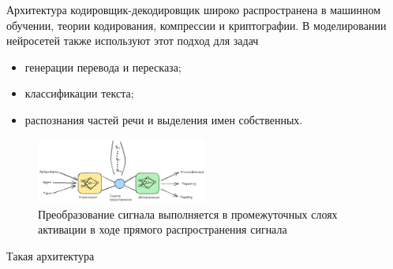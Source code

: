 Архитектура кодировщик-декодировщик широко распространена в машинном обучении, теории кодирования, компрессии и
криптографии. В моделировании нейросетей также используют этот подход для задач \begin{itemize}
    \item генерации перевода и пересказа;
    \item классификации текста;
    \item распознания частей речи и выделения имен собственных.
\end{itemize}

\begin{figure}[h]
    \centering
    \includegraphics[width=0.5\textwidth]{assets/ml/nn/encoder_decoder.excalidraw.png}
    \caption{Преобразование сигнала выполняется в промежуточных слоях активации в ходе прямого распространения сигнала}
    \label{encoder}
\end{figure}

Такая архитектура 

